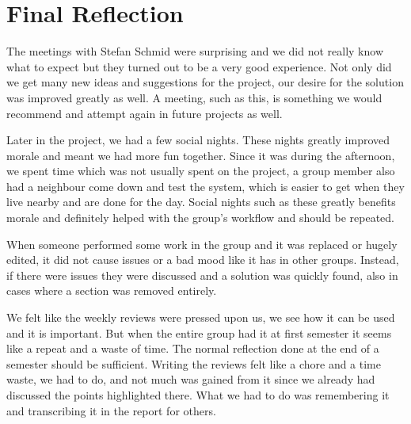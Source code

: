 \section{Final Reflection}\label{sec:FinRef}
The meetings with Stefan Schmid were surprising and we did
not really know what to expect but they turned out to be a very good
experience.
Not only did we get many new ideas and suggestions for the project, our desire for the
solution was improved greatly as well. A meeting, such as this, is something we
would recommend and attempt again in future projects as well.\nl

Later in the project, we had a few social nights. These nights greatly improved
morale and meant we had more fun together. Since it was during the afternoon,
we spent time which was not usually spent on the project, a group member also
had a neighbour come down and test the system, which is easier to get when they
live nearby and are done for the day. Social nights such as these greatly
benefits morale and definitely helped with the group's workflow and should be
repeated.\nl

When someone performed some work in the group and it was replaced or hugely
edited, it did not cause issues or a bad mood like it has in other groups.
Instead, if there were issues they were discussed and a solution was quickly
found, also in cases where a section was removed entirely.\nl

We felt like the weekly reviews were pressed upon us, we see how it can be used
and it is important. But when the entire group had it at first semester it seems
like a repeat and a waste of time. The normal reflection done at the end of a
semester should be sufficient. Writing the reviews felt like a chore and a time
waste, we had to do, and not much was gained from it since we already had
discussed the points highlighted there. What we had to do was remembering it and
transcribing it in the report for others.